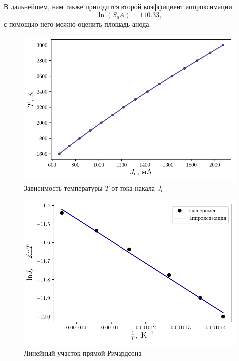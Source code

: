 В дальнейшем, нам также пригодится второй коэффициент аппроксимации
\begin{equation}
    \label{eq:S}
    \ln(S_a A) = 110.33,
\end{equation}
с помощью него можно оценить площадь анода.
\begin{figure}[H]
	\centering
    \includegraphics[width=0.75\linewidth]{scripts/lengmur}
	\caption{Зависимость температуры $T$ от тока накала $J_{\text{н}}$}
	\label{fig:temperature}
\end{figure}

\begin{figure}[H]
	\centering
	\includegraphics[width=0.75\linewidth]{scripts/richardson}
	\caption{Линейный участок прямой Ричардсона}
	\label{fig:richardson}
\end{figure}

